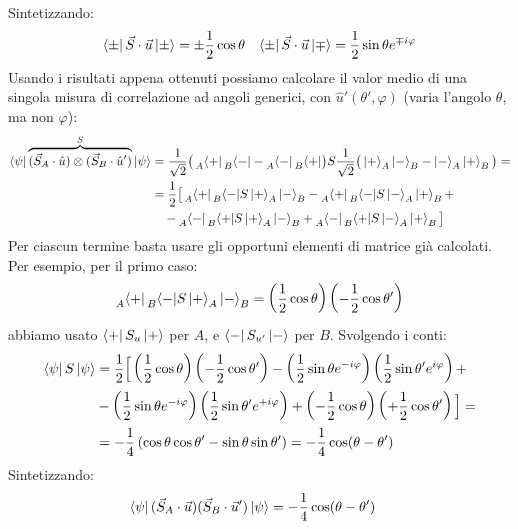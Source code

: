 \documentclass[../../FisicaTeorica.tex]{subfiles}
\begin{document}
Sintetizzando:
\begin{align*}
\Bra{\pm}\vec{S}\cdot \vec{u}\Ket{\pm} = \pm \frac{1}{2}\cos\theta && \Bra{\pm}\vec{S}\cdot \vec{u}\Ket{\mp} = \frac{1}{2}\sin\theta e^{\mp i\varphi}
\end{align*}
Usando i risultati appena ottenuti possiamo calcolare il valor medio di una singola misura di correlazione ad angoli generici, con $\hat{u}'(\theta', \varphi)$ (varia l'angolo $\theta$, ma non $\varphi$):
\begin{align*}
\Bra{\psi}\overbrace{(\vec{S}_A\cdot \hat{u}) \otimes (\vec{S}_B\cdot \hat{u}')}^{S}\Ket{\psi} &= \frac{1}{\sqrt{2}}\big(\prescript{}{A}{\Bra{+}}
\prescript{}{B}{\Bra{-}}-\prescript{}{A}{\Bra{-}}\prescript{}{B}{\Bra{+}}\big)S\frac{1}{\sqrt{2}}\big(\Ket{+}_A\Ket{-}_B-\Ket{-}_A\Ket{+}_B\big)=\\
&=\frac{1}{2}\big[
\prescript{}{A}{\Bra{+}}\prescript{}{B}{\Bra{-}} S \Ket{+}_A\Ket{-}_B -
\prescript{}{A}{\Bra{+}} \prescript{}{B}{\Bra{-}}S\Ket{-}_A\Ket{+}_B +\\
&\quad -\prescript{}{A}{\Bra{-}}\prescript{}{B}{\Bra{+}}S \Ket{+}_A\Ket{-}_B + \prescript{}{A}{\Bra{-}}\prescript{}{B}{\Bra{+}}S\Ket{-}_A\Ket{+}_B
\big]
\end{align*}
Per ciascun termine basta usare gli opportuni elementi di matrice già calcolati. Per esempio, per il primo caso:
\begin{align*}
\prescript{}{A}{\Bra{+}}\prescript{}{B}{\Bra{-}} S \Ket{+}_A\Ket{-}_B = \left(\frac{1}{2}\cos\theta\right)\left(-\frac{1}{2}\cos\theta'\right)
\end{align*}
abbiamo usato $\Bra{+}S_u\Ket{+}$ per $A$, e $\Bra{-}S_{u'}\Ket{-}$ per $B$. Svolgendo i conti:
\begin{align*}
\Bra{\psi}S\Ket{\psi}&=\frac{1}{2}\Big[\left(\frac{1}{2}\cos\theta\right)\left(-\frac{1}{2}\cos\theta'\right) - \left(\frac{1}{2}\sin\theta e^{-i\varphi}\right)\left(\frac{1}{2}\sin\theta' e^{i\varphi}\right)+\\
&-\left(\frac{1}{2}\sin\theta e^{-i\varphi}\right)\left(\frac{1}{2}\sin\theta'e^{+i\varphi}\right) + \left(-\frac{1}{2}\cos\theta\right)\left(+\frac{1}{2}\cos\theta'\right)\Big] =\\
&=-\frac{1}{4}\left(\cos\theta \cos\theta' - \sin\theta\sin\theta'\right) = -\frac{1}{4}\cos(\theta-\theta')
\end{align*}
Sintetizzando:
\begin{align}
\Bra{\psi} (\vec{S}_A \cdot \vec{u})(\vec{S}_B \cdot \vec{u}') \Ket{\psi} &= -\frac{1}{4}\cos(\theta-\theta')
\label{eqn:corr1}
\end{align}
\end{document}
